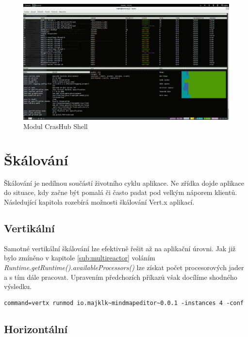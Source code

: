 \begin{figure}
\begin{centering}
\includegraphics[scale=0.21]{obrazky/real_interaction}
\par\end{centering}
\caption{Modul CrasHub Shell\label{fig:real_interaction}}
\end{figure}

\section{Škálování}\label{sub:Scaling}

Škálování je nedílnou součástí životního cyklu aplikace. Ne zřídka dojde aplikace do situace, kdy začne být pomalá či často padat pod velkým náporem klientů. Následující kapitola rozebírá možnosti škálování Vert.x aplikací.

\FloatBarrier

\subsection{Vertikální}

Samotné vertikální škálování lze efektivně řešit až na aplikační úrovni. Jak již bylo zmíněno v kapitole \ref{sub:multireactor} voláním \emph{Runtime.getRuntime().availableProcessors()} lze získat počet procesorových jader a s tím dále pracovat. Upravením předchozích příkazů však docílíme shodného výsledku.

\begin{lstlisting}
command=vertx runmod io.majklk~mindmapeditor~0.0.1 -instances 4 -conf
\end{lstlisting}

\subsection{Horizontální}\label{sub:praktCluster}

